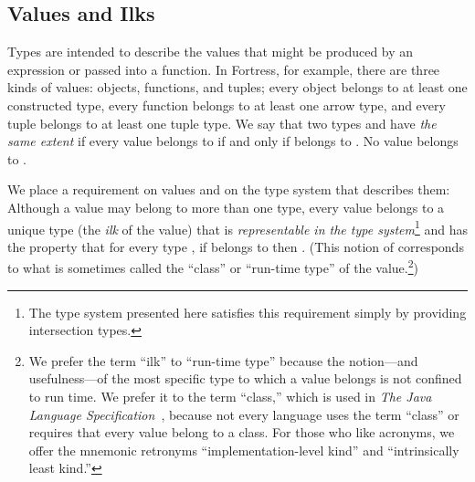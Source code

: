\documentclass[10pt]{sigplanconf}
\newcommand{\TODO}[1]{\textbf{\emph{\textcolor{red}{TODO}}}: \textsf{\footnotesize #1}}
\newcommand{\Bottom}{\TYP{Bottom}}
\begin{document}


\subsection{Values and Ilks}

Types are intended to describe the values that might be produced by
an expression or passed into a function.
In Fortress, for example, there are three kinds of values: 
objects, functions, and tuples;
every object belongs to at least one constructed type,
every function belongs to at least one arrow type,
and every tuple belongs to at least one tuple type.
We say that two types  and  have \emph{the same extent}
if every value  belongs to  if and only if  belongs to .
No value belongs to \Bottom.

We place a requirement on values and on the type system that describes them: 
Although a value may belong to more than one type, 
every value  belongs to a unique type  
(the \emph{ilk} of the value) 
that is \emph{representable in the type system}\footnote{The
type system presented here satisfies this requirement 
simply by providing intersection types.  
} 
and has the property that for every type , 
if  belongs to  then .
(This notion of  corresponds to what is sometimes called the
``class'' or ``run-time type'' of the value.\footnote{%
We prefer the term ``ilk'' to ``run-time type'' 
because the notion---and usefulness---of 
the most specific type to which a value belongs 
is not confined to run time.
We prefer it to the term ``class,'' 
which is used in {\it The Java Language Specification}~\cite{JavaSpec}, 
because not every language uses the term ``class'' 
or requires that every value belong to a class.  
For those who like acronyms, 
we offer the mnemonic retronyms 
``implementation-level kind'' 
and ``intrinsically least kind.''})
\end{document}
